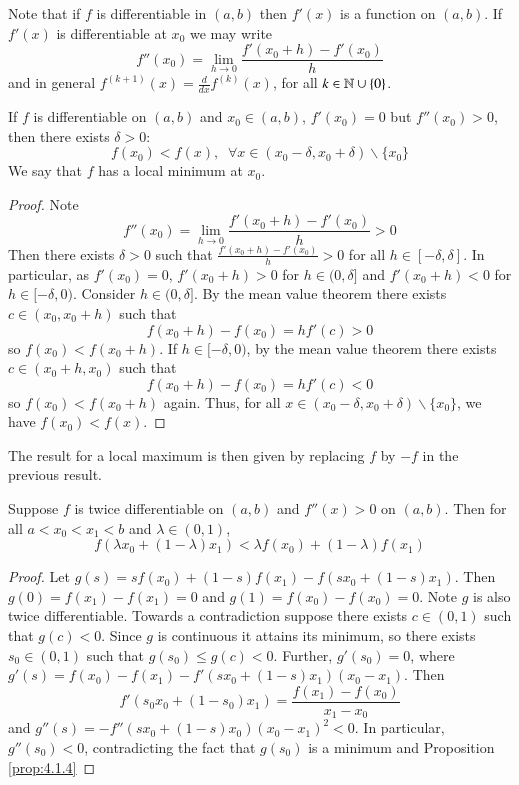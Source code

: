 Note that if $f$ is differentiable in $(a,b)$ then $f'(x)$ is a function on $(a,b)$. If $f'(x)$ is differentiable at $x_0$ we may write \begin{equation*}
    f''(x_0) = \lim\limits_{h\rightarrow 0}\frac{f'(x_0+h)-f'(x_0)}{h}
\end{equation*}
and in general $f^{(k+1)}(x) = \frac{d}{dx}f^{(k)}(x)$, for all $k \in \mathbb N\cup\{0\}$.

\begin{proposition}\label{prop:4.1.4}
    If $f$ is differentiable on $(a,b)$ and $x_0 \in (a,b)$, $f'(x_0) = 0$ but $f''(x_0) > 0$, then there exists $\delta > 0$: $$f(x_0) < f(x),\;\;\forall x \in (x_0-\delta,x_0+\delta)\backslash \{x_0\}$$ We say that $f$ has a local minimum at $x_0$.
\end{proposition}
\begin{proof}
    Note $$f''(x_0) = \lim\limits_{h\rightarrow 0}\frac{f'(x_0+h) - f'(x_0)}{h} > 0$$ Then there exists $\delta >0$ such that $\frac{f'(x_0+h) - f'(x_0)}{h} > 0$ for all $h \in [-\delta,\delta]$. In particular, as $f'(x_0) = 0$, $f'(x_0+h) > 0$ for $h \in (0,\delta]$ and $f'(x_0+h) < 0$ for $h \in [-\delta, 0)$. Consider $h \in (0,\delta]$. By the mean value theorem there exists $c \in (x_0,x_0+h)$ such that \begin{equation*}
        f(x_0+h) - f(x_0) = hf'(c) > 0
    \end{equation*}
    so $f(x_0) < f(x_0+h)$. If $h \in [-\delta,0)$, by the mean value theorem there exists $c \in (x_0+h,x_0)$ such that \begin{equation*}
        f(x_0+h) - f(x_0) = hf'(c) < 0
    \end{equation*}
    so $f(x_0) < f(x_0+h)$ again. Thus, for all $x \in (x_0 - \delta,x_0+\delta)\backslash\{x_0\}$, we have $f(x_0) < f(x)$.
\end{proof}

The result for a local maximum is then given by replacing $f$ by $-f$ in the previous result.

\begin{proposition}\label{prop:4.1.5}
    Suppose $f$ is twice differentiable on $(a,b)$ and $f''(x) > 0$ on $(a,b)$. Then for all $a < x_0 < x_1 < b$ and $\lambda \in (0,1)$, $$f(\lambda x_0+(1-\lambda)x_1) < \lambda f(x_0) + (1-\lambda)f(x_1)$$
\end{proposition}
\begin{proof}
    Let $g(s) = sf(x_0) + (1-s)f(x_1) - f(sx_0+(1-s)x_1)$. Then $g(0) = f(x_1) - f(x_1) = 0$ and $g(1) = f(x_0) - f(x_0) = 0$. Note $g$ is also twice differentiable. Towards a contradiction suppose there exists $c \in (0,1)$ such that $g(c) < 0$. Since $g$ is continuous it attains its minimum, so there exists $s_0 \in (0,1)$ such that $g(s_0) \leq g(c) < 0$. Further, $g'(s_0) = 0$, where $g'(s) = f(x_0) - f(x_1) - f'(sx_0+(1-s)x_1)(x_0-x_1)$. Then $$f'(s_0x_0+(1-s_0)x_1) = \frac{f(x_1)-f(x_0)}{x_1-x_0}$$ and $g''(s) = -f''(sx_0 + (1-s)x_0)(x_0-x_1)^2 < 0$. In particular, $g''(s_0) < 0$, contradicting the fact that $g(s_0)$ is a minimum and Proposition \ref{prop:4.1.4}
\end{proof}






